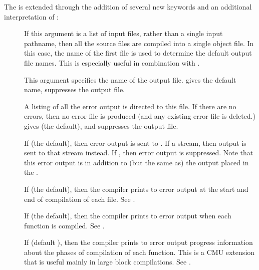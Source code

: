The \cmucl{}  is extended through the addition of several new
keywords and an additional interpretation of :
\begin{description}

\item[] If this argument is a list of input
files, rather than a single input pathname, then all the source files
are compiled into a single object file.  In this case, the name of
the first file is used to determine the default output file names.
This is especially useful in combination with .

\item[] This argument specifies the name of the
output file.  \true{} gives the default name, \false{} suppresses the
output file.

\item[] A listing of all the error output is directed
to this file.  If there are no errors, then no error file is produced
(and any existing error file is deleted.)  \true{} gives
 (the default), and \false{} suppresses
the output file.

\item[]
If \true{} (the default), then error output is sent to .  If
a stream, then output is sent to that stream instead.  If \false, then error
output is suppressed.  Note that this error output is in addition to (but the
same as) the output placed in the .

\item[] If \true{} (the default), then the compiler
prints to error output at the start and end of compilation of each
file.  See .

\item[]
If \true{} (the default), then the compiler prints to error output
when each function is compiled.  See .

\item[] If \true{} (default \false{}), then the
compiler prints to error output progress information about the phases
of compilation of each function.  This is a CMU extension that is
useful mainly in large block compilations.  See .


\end{description}

